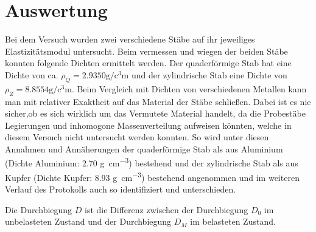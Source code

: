 \section{Auswertung}
\label{sec:Auswertung}

Bei dem Versuch wurden zwei verschiedene Stäbe auf ihr jeweiliges Elastizitätsmodul untersucht.
Beim vermessen und wiegen der beiden Stäbe konnten folgende Dichten ermittelt werden.
Der quaderförmige Stab hat eine Dichte von ca. $\rho_Q = 2.9350 \si{\gram\per\cubic\centi\meter}$
und der zylindrische Stab eine Dichte von $\rho_Z = 8.8554 \si{\gram\per\cubic\centi\meter}$.
Beim Vergleich mit Dichten von verschiedenen Metallen kann man mit relativer Exaktheit auf das Material
der Stäbe schließen. Dabei ist es nie sicher,ob es sich wirklich um das Vermutete Material handelt, 
da die Probestäbe Legierungen und inhomogone Massenverteilung aufweisen könnten,
welche in diesem Versuch nicht untersucht werden konnten. So wird unter diesen Annahmen und Annäherungen der 
quaderförmige Stab als aus Aluminium (Dichte Aluminium: 2.70 \si{\gram\per\cubic\centi\meter}\cite{taschenbuch_physik}) bestehend
 und der zylindrische Stab als aus Kupfer (Dichte Kupfer: 8.93 \si{\gram\per\cubic\centi\meter}\cite{taschenbuch_physik}) bestehend angenommen und im weiteren Verlauf des Protokolls auch so identifiziert und unterschieden.



Die Durchbiegung $D$ ist die Differenz zwischen der Durchbiegung $D_0$ im unbelasteten Zustand und der
Durchbiegung $D_M$ im belasteten Zustand.



